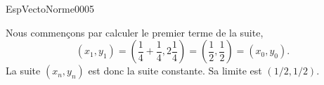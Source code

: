 \begin{corrige}{EspVectoNorme0005}

Nous commençons par calculer le premier terme de la suite, 
\begin{equation}
  (x_1, y_1)=\left(\frac{1}{4}+\frac{1}{4}, 2\frac{1}{4}\right)= \left(\frac{1}{2},\frac{1}{2}\right)=(x_0,y_0).
\end{equation}
La suite $(x_n, y_n)$ est donc la suite constante. Sa limite est $(1/2, 1/2)$. 

\end{corrige}
